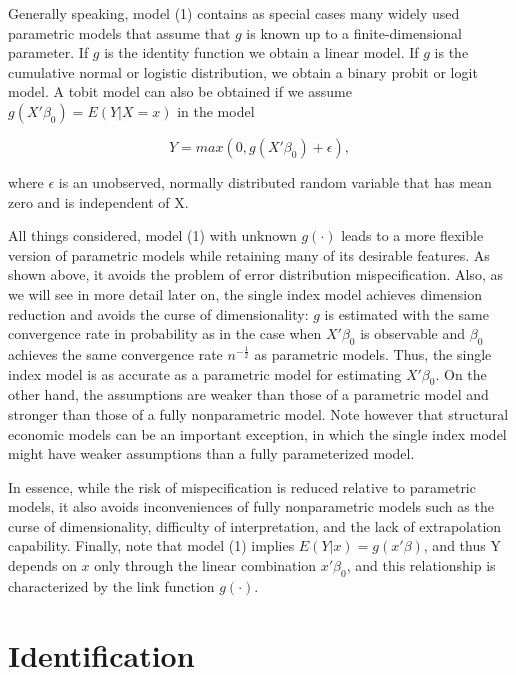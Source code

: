 \documentclass[a4paper]{article}
\begin{document}
Generally speaking, model (1) contains as special cases many widely used parametric models that assume that $g$ is known up to a finite-dimensional parameter. If $g$ is the identity function we obtain a linear model. If $g$ is the cumulative normal or logistic distribution, we obtain a binary probit or logit model.
A tobit model can also be obtained if we assume $g(X'\beta_0) = E(Y|X=x)$ in the model


\[
    Y = max (0, g(X'\beta_0) + \epsilon),
\]

where $\epsilon$ is an unobserved, normally distributed random variable that has mean zero and is independent of X. 

All things considered, model (1) with unknown $g(\cdot)$ leads to a more flexible version of parametric models while retaining many of its desirable features. As shown above, it avoids the problem of error distribution mispecification. Also, as we will see in more detail later on, the single index model achieves dimension reduction and avoids the curse of dimensionality: $g$ is estimated with the same convergence rate in probability as in the case when $X'\beta_0$ is observable and $\beta_0$ achieves the same convergence rate $n^{-\frac{1}{2}}$ as parametric models. Thus, the single index model is as accurate as a parametric model for estimating $X'\beta_0$. On the other hand, the assumptions are weaker than those of a parametric model and stronger than those of a fully nonparametric model. Note however that structural economic models can be an important exception, in which the single index model might have weaker assumptions than a fully parameterized model. %

In essence, while the risk of mispecification is reduced relative to parametric models, it also avoids inconveniences of fully nonparametric models such as the curse of dimensionality, difficulty of interpretation, and the lack of extrapolation capability. Finally, note that model (1) implies $E(Y|x) = g(x'\beta)$, and thus Y depends on $x$ only through the linear combination $x'\beta_0$, and this relationship is characterized by the link function $g(\cdot)$.  %


\section{Identification} %
\label{sec:Identification}
\end{document}
